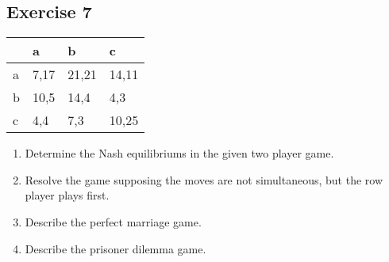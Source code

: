 \documentclass[\main/main.tex]{subfiles}
\begin{document}
\subsection{Exercise 7}
\begin{table}
  \begin{tabular}{LLLL}
      & a    & b     & c     \\
    \hline
    a & 7,17 & 21,21 & 14,11 \\
    b & 10,5 & 14,4  & 4,3   \\
    c & 4,4  & 7,3   & 10,25
  \end{tabular}
\end{table}

\begin{enumerate}
  \item Determine the Nash equilibriums in the given two player game.
  \item Resolve the game supposing the moves are not simultaneous, but the row player plays first.
  \item Describe the perfect marriage game.
  \item Describe the prisoner dilemma game.
\end{enumerate}
\end{document}
